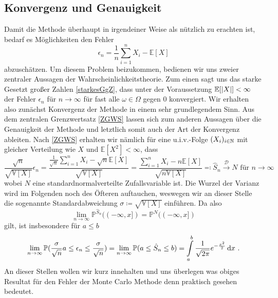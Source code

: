 	\subsection{Konvergenz und Genauigkeit}
	Damit die Methode überhaupt in irgendeiner Weise als nützlich zu erachten ist, bedarf es Möglichkeiten den Fehler \[
	 \epsilon_n = \frac{1}{n}\sum_{i=1}^{n}X_i -  \mathbb{E}[X]
	\]
	abzuschätzen. Um diesem Problem beizukommen, bedienen wir uns zweier zentraler Aussagen der Wahrscheinlichkeitstheorie. Zum einen sagt uns das starke Gesetzt großer Zahlen \ref{starkesGgZ}, dass unter der Voraussetzung $ \mathbb{E}[| X |]<\infty $ der Fehler $ \epsilon_n $ für $ n \to \infty $ für fast alle $ \omega \in \Omega $ gegen $ 0 $ konvergiert. Wir erhalten also zunächst Konvergenz der Methode in einem sehr grundlegendem Sinn. Aus dem zentralen Grenzwertsatz \ref{ZGWS} lassen sich zum anderen Aussagen über die Genauigkeit der Methode und letztlich somit auch der Art der Konvergenz ableiten. Nach \ref{ZGWS} erhalten wir nämlich für eine u.i.v.-Folge $ (X_i)_{i \in \mathbb{N}} $ mit gleicher Verteilung wie $ X $ und $ \mathbb{E}[X^2] < \infty $, dass
	 \[ 
	 \frac{\sqrt{n}}{\sqrt{\mathbb{V}[X]}} \epsilon_n =  \frac{\frac{1}{\sqrt{n}}\sum_{i=1}^{n}X_i-\sqrt{n}\mathbb{E}[X]}{\sqrt{\mathbb{V}[X]}} = \frac{\sum_{i=1}^{n}X_i-n\mathbb{E}[X]}{\sqrt{n\mathbb{V}[X]}} \eqqcolon \hat{S}_n \stackrel{\mathcal{D}}{\to} N \text{ für } n \to \infty 
	 \]
	 wobei $N$ eine standardnormalverteilte Zufallsvariable ist. Die Wurzel der Varianz wird im Folgenden noch des Öfteren auftauchen, weswegen wir an dieser Stelle die sogenannte Standardabweichung $ \sigma \coloneqq \sqrt{\mathbb{V}[X]} $ einführen.
	 Da also 
	 \[ \lim\limits_{n \to \infty} \mathbb{P}^{\hat{S}_n}((-\infty,x]) = \mathbb{P}^N((-\infty,x])
	 \]
	 gilt, ist insbesondere für $ a \leq b $
	 \[
	 	\lim\limits_{n \to \infty} \mathbb{P}(\frac{\sigma}{\sqrt{n}}a \leq \epsilon_n \leq \frac{\sigma}{\sqrt{n}}) = \lim\limits_{n \to \infty} \mathbb{P}(a \leq \hat{S}_n \leq b) = \int\limits_a^b \frac{1}{\sqrt{2\pi}}e^{-\frac{x^2}{2}} \, \mathrm{d} x \ .
	 \]
	 An dieser Stellen wollen wir kurz innehalten und uns überlegen was obiges Resultat für den Fehler der Monte Carlo Methode denn praktisch gesehen bedeutet. 
